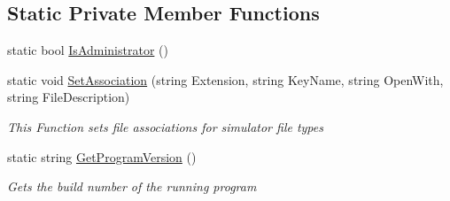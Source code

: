 \subsection*{Static Private Member Functions}
\begin{DoxyCompactItemize}
\item 
static bool \hyperlink{class_c_p_u___o_s___simulator_1_1_main_window_ac84f58171f511e299566cb11c3a53e48}{Is\+Administrator} ()
\item 
static void \hyperlink{class_c_p_u___o_s___simulator_1_1_main_window_ac2d9309ba55c536660c9b98dff7e40b1}{Set\+Association} (string Extension, string Key\+Name, string Open\+With, string File\+Description)
\begin{DoxyCompactList}\small\item\em This Function sets file associations for simulator file types \end{DoxyCompactList}\item 
static string \hyperlink{class_c_p_u___o_s___simulator_1_1_main_window_a4871bf311e6341a2339deff4ad6c2648}{Get\+Program\+Version} ()
\begin{DoxyCompactList}\small\item\em Gets the build number of the running program \end{DoxyCompactList}\end{DoxyCompactItemize}
